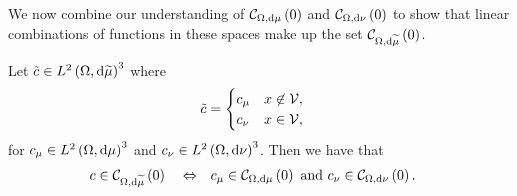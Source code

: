 We now combine our understanding of $\mathcal{C}_{ \Omega, \mathrm{d}\mu}\left( 0 \right)$ and $\mathcal{C}_{ \Omega, \mathrm{d}\nu}\left( 0 \right)$ to show that linear combinations of functions in these spaces make up the set $\mathcal{C}_{ \Omega, \mathrm{d}\widetilde{\mu}}\left( 0 \right)$.
\begin{prop} \label{prop:ThickVertexCurlZeroCharacterisation}
	Let $\tilde{c}\in L^{2}\left( \Omega,\mathrm{d} \widetilde{\mu} \right)^3$ where
	\begin{align*}
		\tilde{c} &= \begin{cases} c_{\mu} & x\not\in\mathcal{V}, \\ c_{\nu} & x\in\mathcal{V}, \end{cases}
	\end{align*}
	for $c_{\mu}\in L^{2}\left( \Omega,\mathrm{d} \mu \right)^3$ and $c_{\nu}\in L^{2}\left( \Omega,\mathrm{d} \nu \right)^3$.
	Then we have that
	\begin{align*}
		c\in\mathcal{C}_{ \Omega, \mathrm{d}\widetilde{\mu}}\left( 0 \right) \quad\Leftrightarrow\quad 
		& c_{\mu}\in\mathcal{C}_{ \Omega, \mathrm{d}\mu}\left( 0 \right) \text{ and } c_{\nu}\in\mathcal{C}_{ \Omega, \mathrm{d}\nu}\left( 0 \right).
	\end{align*}
\end{prop}
